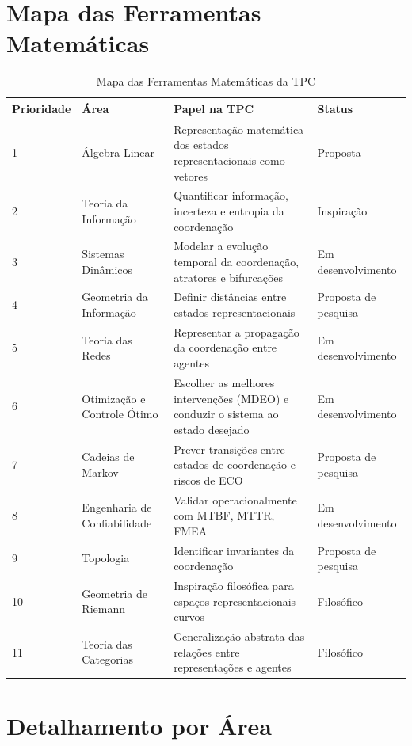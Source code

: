 \documentclass[12pt,a4paper]{article}
\begin{document}
\section{Mapa das Ferramentas Matemáticas}

\begin{table}[h]
\centering
\caption{Mapa das Ferramentas Matemáticas da TPC}
\begin{tabularx}{\textwidth}{p{1cm}p{3.5cm}p{4.5cm}p{2.5cm}}
\toprule
\textbf{Prioridade} & \textbf{Área} & \textbf{Papel na TPC} & \textbf{Status} \\
\midrule
1 & Álgebra Linear & Representação matemática dos estados representacionais como vetores & Proposta \\
2 & Teoria da Informação & Quantificar informação, incerteza e entropia da coordenação & Inspiração \\
3 & Sistemas Dinâmicos & Modelar a evolução temporal da coordenação, atratores e bifurcações & Em desenvolvimento \\
4 & Geometria da Informação & Definir distâncias entre estados representacionais & Proposta de pesquisa \\
5 & Teoria das Redes & Representar a propagação da coordenação entre agentes & Em desenvolvimento \\
6 & Otimização e Controle Ótimo & Escolher as melhores intervenções (MDEO) e conduzir o sistema ao estado desejado & Em desenvolvimento \\
7 & Cadeias de Markov & Prever transições entre estados de coordenação e riscos de ECO & Proposta de pesquisa \\
8 & Engenharia de Confiabilidade & Validar operacionalmente com MTBF, MTTR, FMEA & Em desenvolvimento \\
9 & Topologia & Identificar invariantes da coordenação & Proposta de pesquisa \\
10 & Geometria de Riemann & Inspiração filosófica para espaços representacionais curvos & Filosófico \\
11 & Teoria das Categorias & Generalização abstrata das relações entre representações e agentes & Filosófico \\
\bottomrule
\end{tabularx}
\end{table}

\section{Detalhamento por Área}
\end{document}
